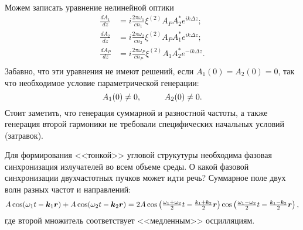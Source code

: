 Можем записать уравнение нелинейной оптики
\begin{align*}
    \frac{d A_1}{d z} &= i \frac{2 \pi \omega_1}{c n_1} \xi^{(2)} A_P A_2^* e^{i k \Delta z}; \\ 
    \frac{d A_2}{d z} &= i \frac{2 \pi \omega_2}{c n_2} \xi^{(2)} A_P A_1^* e^{i k \Delta z}; \\
    \frac{d A_P}{d z} &= i \frac{2 \pi \omega_P}{c n_P} \xi^{(2)} A_1 A_2^* e^{-i k \Delta z}. \\
\end{align*}
Забавно, что эти уравнения не имеют решений, если $A_1(0) = A_2(0) = 0$, так что необходимое условие параметрической генерации:
\begin{equation*}
    A_1 (0) \neq 0,
    \hspace{10 mm} 
    A_2 (0) \neq 0.
\end{equation*}
Стоит заметить, что генерация суммарной и разностной частоты, а также генерация второй гармоники не требовали специфических начальных условий (затравок). 








Для формирования <<тонкой>> угловой струкутуры необходима фазовая синхронизация излучателей во всем объеме среды. О какой фазовой синхронизации двухчастотных пучков может идти речь?
Суммарное поле двух волн разных частот и направлений:
\begin{equation*}
    A \cos(\omega_1 t - \vc{k}_1\vc{r}) + A \cos(\omega_2 t - \vc{k}_2 \vc{r}) = 
    2 A \cos \left(\tfrac{\omega_1+\omega_2}{2} t - \tfrac{\smallvc{k}_1 + \smallvc{k}_2}{2}\vc{r}\right) \cos \left(\tfrac{\omega_1-\omega_2}{2} t - \tfrac{\smallvc{k}_1 - \smallvc{k}_2}{2}\vc{r}\right),
\end{equation*}
где второй множитель соответствует <<медленным>> осцилляциям. 

